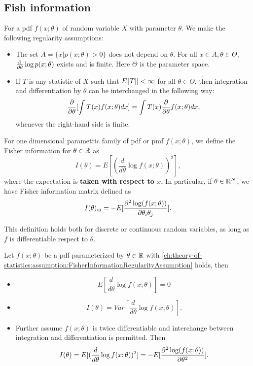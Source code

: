 \begin{refsection}
\subsection{Fish information}
\begin{assumption}\label{ch:theory-of-statistics:assumption:FisherInformationRegularityAssumption}
	For a pdf $f(x;\theta)$ of random variable $X$ with parameter $\theta$. We make the following regularity assumptions:
	\begin{itemize}
		\item The set $A = \{x|p(x;\theta) > 0\}$ does not depend on $\theta$. For all $x\in A, \theta\in \Theta$, $\frac{\partial }{\partial \theta}\log p(x;\theta)$ exists and is finite. Here $\Theta$ is the parameter space.
		\item If $T$ is any statistic of $X$ such that $E[\abs{T}] < \infty$ for all $\theta\in \Theta$, then integration and differentiation by $\theta$ can be interchanged in the following way:
		$$\frac{\partial }{\partial \theta}[\int T(x)f(x;\theta)dx] = \int T(x)\frac{\partial }{\partial \theta} f(x;\theta)dx,$$
		whenever the right-hand side is finite.
	\end{itemize}	
\end{assumption}



\begin{definition}
	For one dimensional parametric family of pdf or pmf $f(x;\theta)$, we define the Fisher information for $\theta\in \mathbb{R}$ as
	$$I(\theta) = E[(\frac{d}{d\theta}\log f(x;\theta))^2],$$
	where the expectation is\textbf{ taken with respect to $x$.}
	In particular, if $\theta \in \mathbb{R}^N$, we have Fisher information matrix defined as
	$$I(\theta)_{ij} =-E[\frac{\partial^2 \log(f(x;\theta))}{\partial \theta_i\theta_j}].$$
\end{definition}

\begin{remark}
	This definition holds both for discrete or continuous random variables, as long as $f$  is differentiable respect to $\theta$. 
\end{remark}

\begin{theorem}\label{ch:theory-of-statistics:th:BasicPropertiesFisherInformation}
	Let $f(x;\theta)$ be a pdf parameterized by $\theta\in \mathbb{R}$ with \autoref{ch:theory-of-statistics:assumption:FisherInformationRegularityAssumption} holds, then 
	\begin{itemize}
		\item $$E[\frac{d}{d\theta} \log f(x;\theta)] = 0$$
		\item $$I(\theta) = Var[\frac{d}{d\theta} \log f(x;\theta)].$$
		\item Further assume $f(x;\theta)$ is twice differentiable and interchange between integration and differentiation is permitted. Then
		$$I(\theta) = E[(\frac{d}{d\theta}\log f(x;\theta))^2] = -E[\frac{\partial^2 \log(f(x;\theta))}{\partial \theta^2}].$$
		

\end{itemize}
\end{theorem}
\end{refsection}
